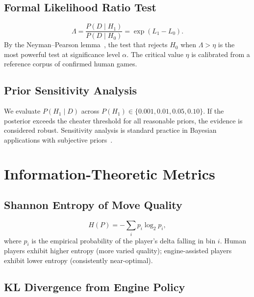 \documentclass[11pt,a4paper]{article}
\begin{document}
\subsection{Formal Likelihood Ratio Test}
\label{sec:lrt}

\begin{equation}
    \Lambda = \frac{P(D \mid H_1)}{P(D \mid H_0)}
    = \exp(L_1 - L_0).
    \label{eq:lrt}
\end{equation}
By the Neyman--Pearson lemma~\citep{neyman1933most}, the test that rejects
$H_0$ when $\Lambda > \eta$ is the most powerful test at significance
level $\alpha$. The critical value $\eta$ is calibrated from a reference
corpus of confirmed human games.

\subsection{Prior Sensitivity Analysis}
\label{sec:sensitivity}

We evaluate $P(H_1 \mid D)$ across
$P(H_1) \in \{0.001, 0.01, 0.05, 0.10\}$. If the posterior exceeds the
cheater threshold for all reasonable priors, the evidence is considered robust.
Sensitivity analysis is standard practice in Bayesian applications with
subjective priors~\citep{berger1987testing}.


\section{Information-Theoretic Metrics}
\label{sec:information_theory}

\subsection{Shannon Entropy of Move Quality}

\begin{equation}
    H(P) = -\sum_{i} p_i \log_2 p_i,
\end{equation}
where $p_i$ is the empirical probability of the player's delta falling in bin
$i$. Human players exhibit higher entropy (more varied quality); engine-assisted
players exhibit lower entropy (consistently near-optimal).

\subsection{KL Divergence from Engine Policy}
\end{document}
